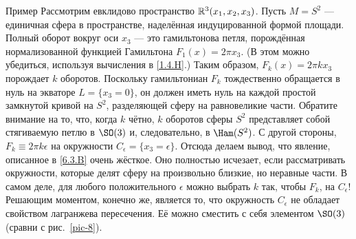 \begin{ex}{Пример}\label{6.3.C}
Рассмотрим евклидово пространство $\mathbb{R}^3 (x_1, x_2, x_3)$.
Пусть $M = S^2$ — единичная сфера в пространстве, наделённая
индуцированной формой площади. 
Полный оборот вокруг оси $x_3$ — это гамильтонова петля, порождённая
нормализованной функцией Гамильтона $F_1 (x) = 2\pi x_3$. 
(В этом можно убедиться, используя вычисления в \ref{1.4.H}.)
Таким образом, $F_k (x) = 2\pi k x_3$ порождает $k$ оборотов.
Поскольку гамильтониан $F_k$ тождественно обращается в нуль на экваторе $L = \{x_3
= 0\}$, он должен иметь нуль на каждой простой
замкнутой кривой на $S^2$, разделяющей сферу на равновеликие части. 
Обратите внимание на то, что, когда $k$ чётно, $k$ оборотов сферы
$S^2$ представляет собой стягиваемую петлю в $\SO (3)$ и,
следовательно, в $\Ham (S^2)$. 
С другой стороны, $F_k \equiv 2\pi k\epsilon$ на окружности
$C_\epsilon = \{x_3 = \epsilon\}$. 
Отсюда делаем вывод, что явление, описанное в \ref{6.3.B} очень жёсткое.
Оно полностью исчезает, если рассматривать окружности, которые делят
сферу на произвольно близкие, но неравные части. 
В самом деле, для любого положительного $\epsilon$ можно выбрать $k$ так,
чтобы $F_k$,  на $C_\epsilon$!
Решающим моментом, конечно же, является то, что окружность
$C_\epsilon$ не обладает свойством лагранжева пересечения. 
Её можно сместить с себя элементом $\SO (3)$ (сравни с рис.~\ref{pic-8}). 
\end{ex}
